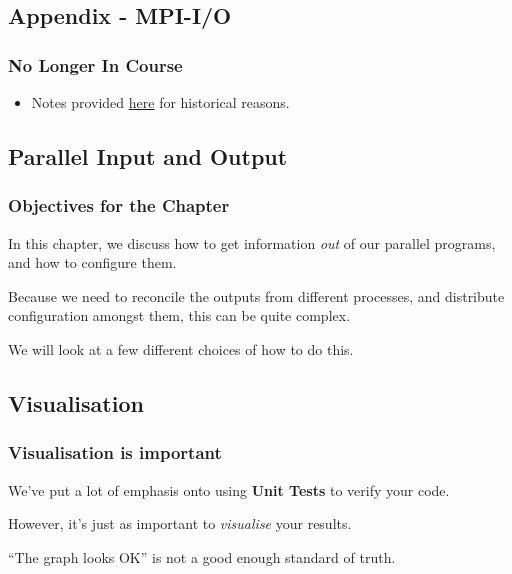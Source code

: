 \subsection{Appendix - MPI-I/O}\label{appendix---mpi-io-1}

\subsubsection{No Longer In Course}\label{no-longer-in-course-1}

\begin{itemize}
\itemsep1pt\parskip0pt
\item
  Notes provided \href{sec01Intro}{here} for historical reasons.
\end{itemize}

\subsection{Parallel Input and Output}\label{parallel-input-and-output}

\subsubsection{Objectives for the
Chapter}\label{objectives-for-the-chapter}

In this chapter, we discuss how to get information \emph{out} of our
parallel programs, and how to configure them.

Because we need to reconcile the outputs from different processes, and
distribute configuration amongst them, this can be quite complex.

We will look at a few different choices of how to do this.

\subsection{Visualisation}\label{visualisation}

\subsubsection{Visualisation is
important}\label{visualisation-is-important}

We've put a lot of emphasis onto using \textbf{Unit Tests} to verify
your code.

However, it's just as important to \emph{visualise} your results.

``The graph looks OK'' is not a good enough standard of truth.

